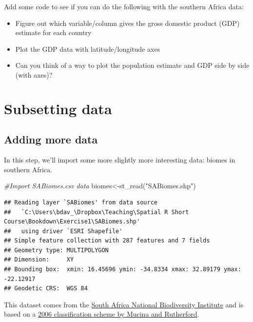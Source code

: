 \documentclass[
]{book}
\newenvironment{Shaded}{\begin{snugshade}}{\end{snugshade}}
\newcommand{\CommentTok}[1]{\textcolor[rgb]{0.56,0.35,0.01}{\textit{#1}}}
\newcommand{\FunctionTok}[1]{\textcolor[rgb]{0.00,0.00,0.00}{#1}}
\newcommand{\NormalTok}[1]{#1}
\newcommand{\OtherTok}[1]{\textcolor[rgb]{0.56,0.35,0.01}{#1}}
\newcommand{\StringTok}[1]{\textcolor[rgb]{0.31,0.60,0.02}{#1}}
\providecommand{\tightlist}{%
  \setlength{\itemsep}{0pt}\setlength{\parskip}{0pt}}
\begin{document}
Add some code to see if you can do the following with the southern Africa data:

\begin{itemize}
\tightlist
\item
  Figure out which variable/column gives the gross domestic product (GDP) estimate for each country
\item
  Plot the GDP data with latitude/longitude axes
\item
  Can you think of a way to plot the population estimate and GDP side by side (with axes)?
\end{itemize}

\hypertarget{subsetting-data}{%
\chapter{Subsetting data}\label{subsetting-data}}

\hypertarget{adding-more-data}{%
\section{Adding more data}\label{adding-more-data}}

In this step, we'll import some more slightly more interesting data: biomes in southern Africa.

\begin{Shaded}
\begin{Highlighting}[]
\CommentTok{\#Import SABiomes.csv data}
\NormalTok{biomes}\OtherTok{\textless{}{-}}\FunctionTok{st\_read}\NormalTok{(}\StringTok{"SABiomes.shp"}\NormalTok{)}
\end{Highlighting}
\end{Shaded}

\begin{verbatim}
## Reading layer `SABiomes' from data source 
##   `C:\Users\bdav_\Dropbox\Teaching\Spatial R Short Course\Bookdown\Exercise1\SABiomes.shp' 
##   using driver `ESRI Shapefile'
## Simple feature collection with 287 features and 7 fields
## Geometry type: MULTIPOLYGON
## Dimension:     XY
## Bounding box:  xmin: 16.45696 ymin: -34.8334 xmax: 32.89179 ymax: -22.12917
## Geodetic CRS:  WGS 84
\end{verbatim}

This dataset comes from the \href{https://www.sanbi.org/}{South Africa National Biodiversity Institute} and is based on a \href{https://www.cabdirect.org/cabdirect/abstract/20073221934}{2006 classification scheme by Mucina and Rutherford}.
\end{document}

